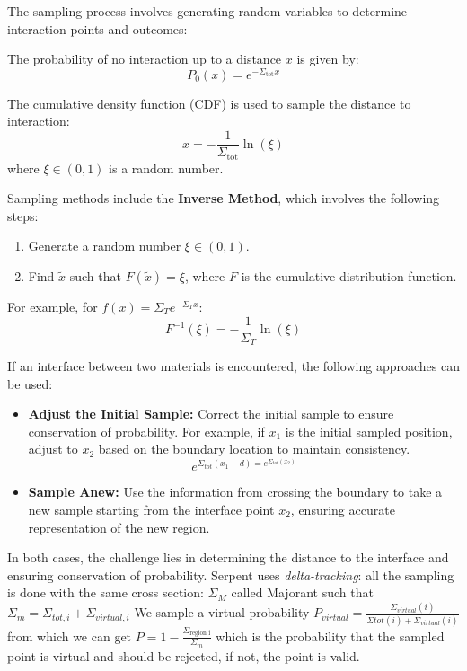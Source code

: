 The sampling process involves generating random variables to determine interaction points and outcomes:

The probability of no interaction up to a distance $x$ is given by:
\begin{equation}
P_0(x) = e^{-\Sigma_{\text{tot}} x}
\end{equation}

The cumulative density function (CDF) is used to sample the distance to interaction:
\begin{equation}
x = -\frac{1}{\Sigma_{\text{tot}}}\ln(\xi)
\end{equation}
where $\xi \in (0, 1)$ is a random number.

Sampling methods include the \textbf{Inverse Method}, which involves the following steps:
\begin{enumerate}
\item Generate a random number $\xi \in (0, 1)$.
\item Find $\tilde{x}$ such that $F(\tilde{x}) = \xi$, where $F$ is the cumulative distribution function.
\end{enumerate}
For example, for $f(x) = \Sigma_T e^{-\Sigma_T x}$:
\begin{equation}
F^{-1}(\xi) = -\frac{1}{\Sigma_T} \ln(\xi)
\end{equation}

If an interface between two materials is encountered, the following approaches can be used:
\begin{itemize}
\item \textbf{Adjust the Initial Sample:} Correct the initial sample to ensure conservation of probability. For example, if $x_1$ is the initial sampled position, adjust to $x_2$ based on the boundary location to maintain consistency.
\begin{equation}
e^{\Sigma_{tot}(x_1 - d) = e^{\Sigma_{tot}(x_2)}}
\end{equation}
\item \textbf{Sample Anew:} Use the information from crossing the boundary to take a new sample starting from the interface point $x_2$, ensuring accurate representation of the new region.
\end{itemize}

In both cases, the challenge lies in determining the distance to the interface and ensuring conservation of probability.
Serpent uses \textit{delta-tracking}: all the sampling is done with the same cross section: $ \Sigma_M $ called Majorant such that $\Sigma_m = \Sigma_{tot, i} + \Sigma_{virtual, i}$
We sample a virtual probability $P_{virtual} = \frac{\Sigma_{virtual}(i)}{\Sigma{tot}(i) + \Sigma_{virtual}(i)}$ from which we can get $P = 1 - \frac{\Sigma_{\text{region i}}}{\Sigma_m}$ which is the probability that the sampled point is virtual and should be rejected, if not, the point is valid.


